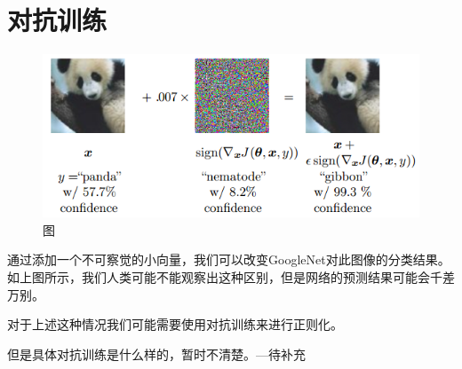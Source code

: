 \section{对抗训练}

	\begin{figure}[!htbp]
	\centering\includegraphics[width=6in]{img/3-5.png}
	\caption{图}\label{fig:3-5}
	\end{figure}
	
	通过添加一个不可察觉的小向量，我们可以改变GoogleNet对此图像的分类结果。如上图所示，我们人类可能不能观察出这种区别，但是网络的预测结果可能会千差万别。
	
	对于上述这种情况我们可能需要使用对抗训练来进行正则化。
	
	但是具体对抗训练是什么样的，暂时不清楚。---待补充
	
	
	
	
	
	
	
	
	
	
	
	
	
	
	
	
	
	
	
	
	
	